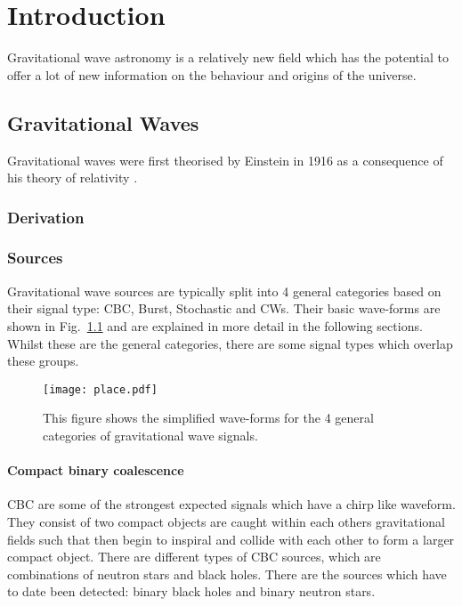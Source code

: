 \chapter{Introduction}

Gravitational wave astronomy is a relatively new field which has the potential to offer a lot of new information on the behaviour and origins of the universe. 

\section{Gravitational Waves}

Gravitational waves were first theorised by Einstein in 1916 as a consequence of his theory of relativity \cite{}. 

\subsection{Derivation}

\subsection{\label{sources}Sources}

Gravitational wave sources are typically split into 4 general categories based on their signal type: \ac{CBC}, Burst, Stochastic and \acp{CW}. Their basic wave-forms are shown in Fig.~\ref{intro:sources:waveforms} and are explained in more detail in the following sections. Whilst these are the general categories, there are some signal types which overlap these groups.

\begin{figure}
\centering
\texttt{[image: place.pdf]}
\caption{This figure shows the simplified wave-forms for the 4 general categories of gravitational wave signals.}
\label{intro:sources:waveforms}
\end{figure}
\subsubsection{\label{sources:cbc} Compact binary coalescence}

\ac{CBC} are some of the strongest expected signals which have a chirp like waveform. They consist of two compact objects are caught within each others gravitational fields such that then begin to inspiral and collide with each other to form a larger compact object. 
There are different types of \ac{CBC} sources, which are combinations of neutron stars and black holes.
There are the sources which have to date been detected: binary black holes and binary neutron stars. 


